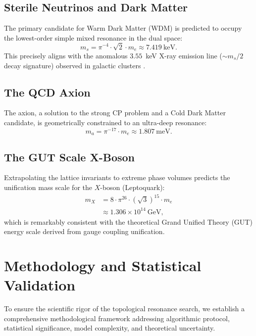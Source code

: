 \documentclass[onecolumn,aps,prd,superscriptaddress,nofootinbib,amsmath,amssymb]{revtex4-2}
\begin{document}
\subsection{Sterile Neutrinos and Dark Matter}
The primary candidate for Warm Dark Matter (WDM) is predicted to occupy the lowest-order simple mixed resonance in the dual space:
\begin{equation}
    m_{s} = \pi^{-4} \cdot \sqrt{2} \cdot m_e \approx 7.419~\text{keV}.
\end{equation}
This precisely aligns with the anomalous $3.55$~keV X-ray emission line ($\sim m_s/2$ decay signature) observed in galactic clusters \cite{boyarsky2014}.

\subsection{The QCD Axion}
The axion, a solution to the strong CP problem and a Cold Dark Matter candidate, is geometrically constrained to an ultra-deep resonance:
\begin{equation}
    m_{a} = \pi^{-17} \cdot m_e \approx 1.807~\text{meV}.
\end{equation}

\subsection{The GUT Scale X-Boson}
Extrapolating the lattice invariants to extreme phase volumes predicts the unification mass scale for the $X$-boson (Leptoquark):
\begin{equation}
\begin{split}
    m_X &= 8 \cdot \pi^{26} \cdot (\sqrt{3})^{15} \cdot m_e \\
    &\approx 1.306 \times 10^{14}~\text{GeV},
\end{split}
    \label{eq:gut_scale}
\end{equation}
which is remarkably consistent with the theoretical Grand Unified Theory (GUT) energy scale derived from gauge coupling unification.

\section{Methodology and Statistical Validation}
\label{sec:methodology}

To ensure the scientific rigor of the topological resonance search, we establish a comprehensive methodological framework addressing algorithmic protocol, statistical significance, model complexity, and theoretical uncertainty.
\end{document}
